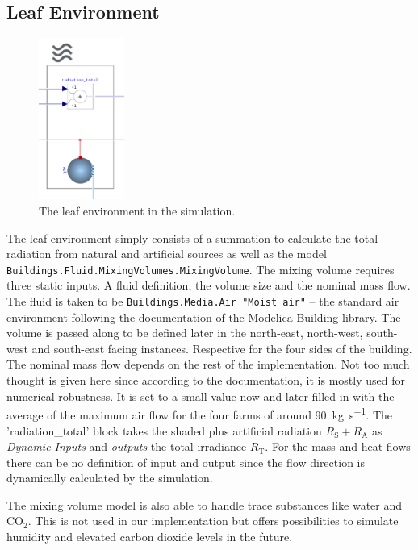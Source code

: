 
\subsection{Leaf Environment}
\begin{figure}
    \centering
	\includegraphics[width=0.25\textwidth]{img/simulation/leaf-env.pdf}
	\caption{The leaf environment in the simulation.}
	\label{wfig:leaf-env}
\end{figure} 

The leaf environment simply consists of a summation to calculate the total radiation from natural and artificial sources as well as the model \lstinline{Buildings.Fluid.MixingVolumes.MixingVolume}.
The mixing volume requires three static inputs.
A fluid definition, the volume size and the nominal mass flow.
The fluid is taken to be  \lstinline{Buildings.Media.Air "Moist air"} -- the standard air environment following the documentation of the Modelica Building library.
The volume is passed along to be defined later in the north-east, north-west, south-west and south-east facing instances.
Respective for the four sides of the building.
The nominal mass flow depends on the rest of the implementation.
Not too much thought is given here since according to the documentation, it is mostly used for numerical robustness.
It is set to a small value now and later filled in with the average of the maximum air flow for the four farms of around \SI{90}{\kg\per\s}.
The 'radiation\_total' block takes the shaded plus artificial radiation $R_\text{S} + R_\text{A}$ as \textit{Dynamic Inputs} and \textit{outputs} the total irradiance $R_\text{T}$.
For the mass and heat flows there can be no definition of input and output since the flow direction is dynamically calculated by the simulation.

The mixing volume model is also able to handle trace substances like water and CO$_2$.
This is not used in our implementation but offers possibilities to simulate humidity and elevated carbon dioxide levels in the future.


